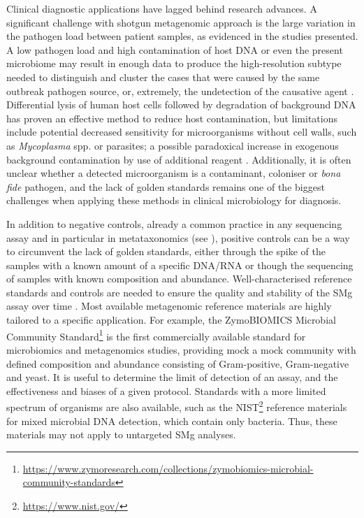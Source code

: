 Clinical diagnostic applications have lagged behind research advances. A significant challenge with shotgun metagenomic approach is the large variation in the pathogen load between patient samples, as evidenced in the studies presented. A low pathogen load and  high contamination of host \ac{DNA} or even the present microbiome may result in enough data to produce the high-resolution subtype needed to distinguish and cluster the cases that were caused by the same outbreak pathogen source, or, extremely, the undetection of the causative agent \citep{carleton_metagenomic_2019, chiu_clinical_2019}. Differential lysis of human host cells followed by degradation of background \ac{DNA} has proven an effective method to reduce host contamination, but limitations include potential decreased sensitivity for microorganisms without cell walls, such as \textit{Mycoplasma} spp. or parasites; a possible paradoxical increase in exogenous background contamination by use of additional reagent \citep{salter_reagent_2014, oneil_ribosomal_2013, feehery_method_2013}. Additionally, it is often unclear whether a detected microorganism is a contaminant, coloniser or \textit{bona fide} pathogen, and the lack of golden standards remains one of the biggest challenges when applying these methods in clinical microbiology for diagnosis. 

In addition to negative controls, already a common practice in any sequencing assay and in particular in metataxonomics (see ), positive controls can be a way to circumvent the lack of golden standards, either through the spike of the samples with a known amount of a specific \ac{DNA}/\ac{RNA} or though the sequencing of samples with known composition and abundance. Well-characterised reference standards and controls are needed to ensure the quality and stability of the \ac{SMg} assay over time \citep{chiu_clinical_2019, mcintyre_comprehensive_2017}. Most available metagenomic reference materials are highly tailored to a specific application. For example, the ZymoBIOMICS Microbial Community Standard\footnote{\url{https://www.zymoresearch.com/collections/zymobiomics-microbial-community-standards}} is the first commercially available standard for microbiomics and metagenomics studies, providing mock a mock community with defined composition and abundance consisting of Gram-positive, Gram-negative and yeast. It is useful to determine the limit of detection of an assay, and the effectiveness and biases of a given protocol. Standards with a more limited spectrum of organisms are also available, such as the \ac{NIST}\footnote{\url{https://www.nist.gov/}} reference materials for mixed microbial \ac{DNA} detection, which contain only bacteria. Thus, these materials may not apply to untargeted \ac{SMg} analyses.

